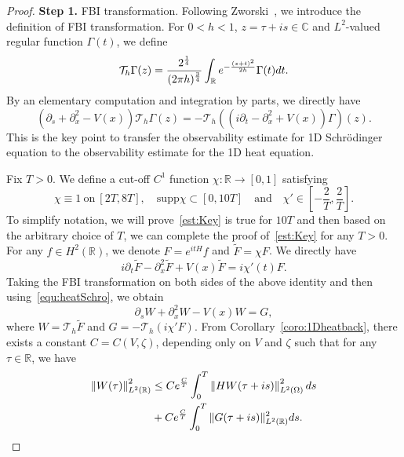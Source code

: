 \documentclass[a4paper,reqno]{amsart}
\theoremstyle{definition}
\numberwithin{equation}{section}
\newcommand{\R}{\mathbb{R}}
\def \R {{\mathbb{R} }}
\def \d {{\rm{d}}}
\def \pt{\partial_{t}}
\begin{document}
\begin{proof}
\textbf{Step 1.} FBI transformation. Following Zworski~\cite{Zworski}, we introduce the definition of FBI transformation. For $0<h<1$, $z=\tau+is\in \mathbb{C}$ and $L^{2}$-valued regular function $\Gamma(t)$, we define
\begin{equation*}
    \mathcal{T}_{h}\Gamma(z)=\frac{2^{\frac{1}{4}}}{(2\pi h)^{\frac{3}{4}}}\int_{\R}e^{-\frac{(z+t)^{2}}{2h}}\Gamma(t)\d t.
\end{equation*}
By an elementary computation and integration by parts, we directly have 
\begin{equation}\label{equ:heatSchro}
    (\partial_{s}+\partial_{x}^{2}-V(x))\mathcal{T}_{h}\Gamma(z)=
    -\mathcal{T}_{h}\left(\left(i\pt-\partial_{x}^{2}+V(x)\right)\Gamma\right)(z).
\end{equation}
This is the key point to transfer the observability estimate for 1D Schr\"odinger equation to the observability estimate for the 1D heat equation.

Fix $T>0$. We define a cut-off $C^{1}$ function $\chi:\R\to [0,1]$ satisfying
\begin{equation}\label{def:chi}
    \chi\equiv 1\ \mbox{on}\ [2T,8T],\quad \mbox{supp}\chi\subset [0,10T]\quad \mbox{and} \quad 
    \chi' \in \left[-\frac{2}{T},\frac{2}{T}\right].
\end{equation}
To simplify notation, we will prove~\eqref{est:Key} is true for $10T$ and then based on the arbitrary choice of $T$, we can complete the proof of~\eqref{est:Key} for any $T>0$. For any $f\in H^{2}(\R)$, we denote $F=e^{itH}f$ and $\widetilde{F}=\chi F$. We directly have 
\begin{equation*}
    i\partial_{t}\widetilde{F}-\partial_{x}^{2}\widetilde{F}+V(x)\widetilde{F}=i\chi'(t)F.
\end{equation*}
Taking the FBI transformation on both sides of the above identity and then using~\eqref{equ:heatSchro}, we obtain 
\begin{equation*}
    \partial_{s}W+\partial_{x}^{2}W-V(x)W=G,
\end{equation*}
where $W=\mathcal{T}_{h}\widetilde{F}$ and $G=-\mathcal{T}_{h}(i\chi'F)$. From Corollary~\ref{coro:1Dheatback}, there exists a constant $C=C(V,\zeta)$, depending only on $V$ and $\zeta$ such that for any $\tau\in \R$, we have 
\begin{equation}\label{est:W}
\begin{aligned}
    \left\|W(\tau)\right\|_{L^{2}(\R)}^{2}
    &\le Ce^{\frac{C}{T}}\int_{0}^{T}\left\|HW(\tau+is)\right\|_{L^{2}(\Omega)}^{2}\d s\\
    &+Ce^{\frac{C}{T}} 
    \int_{0}^{T}\|G(\tau+is)\|^{2}_{L^{2}(\R)}\d s.
    \end{aligned}
\end{equation}


\end{proof}
\end{document}
